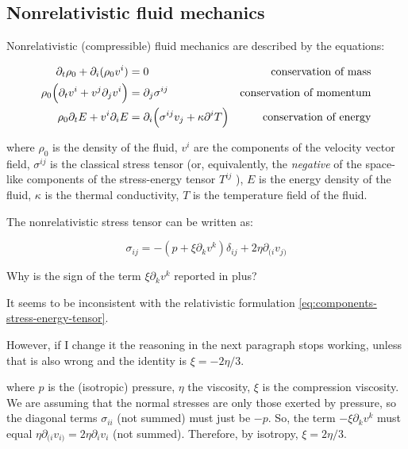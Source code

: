 \documentclass[main.tex]{subfiles}
\begin{document}
\subsection{Nonrelativistic fluid mechanics}

Nonrelativistic (compressible) fluid mechanics are described by the equations:

\begin{subequations}
\begin{align}
    \partial_t \rho_0 + \partial_i (\rho_0 v^i) &= 0 &\text{conservation of mass} \\
    \rho_0 \qty(\partial_t v^i + v^j \partial_j v^i) &= \partial_j \sigma^{ij} &\text{conservation of momentum}  \\
    \rho_0 \partial_t E + v^i \partial_i E &= \partial_i \qty(\sigma^{ij}v_j + \kappa\partial^i T) &\text{conservation of energy}
\end{align}
\end{subequations}

where $\rho_0$ is the density of the fluid,
$v^i$ are the components of the velocity vector field,
$\sigma^{ij}$ is the classical stress tensor (or, equivalently, the \emph{negative} of the  space-like components of the stress-energy tensor \(T^{ij}\) ),
$E$ is the energy density of the fluid,
$\kappa$ is the thermal conductivity,
$T$ is the temperature  field of the fluid.

The nonrelativistic stress tensor can be written as:

\begin{equation}
    \sigma_{ij} = -(p + \xi \partial_k v^k ) \delta_{ij} + 2 \eta \partial_{(i} v_{j)}
\end{equation}

\begin{greenbox}
  Why is the sign of the term \(\xi \partial_k v^k\) reported in \cite[page 301]{Taub:1978} plus?

  It seems to be inconsistent with the relativistic formulation \eqref{eq:components-stress-energy-tensor}.

  However, if I change it the reasoning in the next paragraph stops working, unless that is also wrong and the identity is \(\xi = - 2 \eta /3\).
\end{greenbox}

where $p$ is the (isotropic) pressure, $\eta$ the viscosity, $\xi$ is the compression viscosity. We are assuming that the normal stresses are only those exerted by pressure, so the diagonal terms $\sigma_{ii}$ (not summed) must just be $-p$. So, the term $-\xi \partial_k v^k$ must equal $\eta \partial_{(i} v_{i)} = 2\eta \partial_i v_i$ (not summed). Therefore, by isotropy, $\xi = 2\eta/3$.
\end{document}
